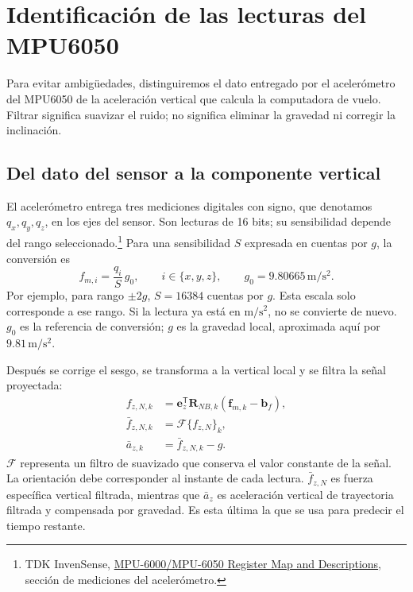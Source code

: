 \documentclass[11pt,a4paper]{article}
\begin{document}
\newpage
\section{Identificación de las lecturas del MPU6050}
Para evitar ambigüedades, distinguiremos el dato entregado por el acelerómetro del MPU6050 de la aceleración vertical que calcula la computadora de vuelo. Filtrar significa suavizar el ruido; no significa eliminar la gravedad ni corregir la inclinación.

\subsection{Del dato del sensor a la componente vertical}
El acelerómetro entrega tres mediciones digitales con signo, que denotamos $q_x,q_y,q_z$, en los ejes del sensor. Son lecturas de 16 bits; su sensibilidad depende del rango seleccionado.\footnote{TDK InvenSense, \href{https://invensense.tdk.com/wp-content/uploads/2015/02/MPU-6000-Register-Map1.pdf}{MPU-6000/MPU-6050 Register Map and Descriptions}, sección de mediciones del acelerómetro.}
Para una sensibilidad $S$ expresada en cuentas por $g$, la conversión es
\begin{equation}
 f_{m,i}=\frac{q_i}{S}\,g_0,\qquad i\in\{x,y,z\},
 \qquad g_0=9.80665\,\mathrm{m/s^2}.
\end{equation}
Por ejemplo, para rango $\pm2g$, $S=16384$ cuentas por $g$. Esta escala solo corresponde a ese rango. Si la lectura ya está en $\mathrm{m/s^2}$, no se convierte de nuevo. $g_0$ es la referencia de conversión; $g$ es la gravedad local, aproximada aquí por $9.81\,\mathrm{m/s^2}$.

Después se corrige el sesgo, se transforma a la vertical local y se filtra la señal proyectada:
\begin{align}
 f_{z,N,k}&=\mathbf e_z^{\mathsf T}\mathbf R_{NB,k}
 (\mathbf f_{m,k}-\mathbf b_f),\\
 \bar f_{z,N,k}&=\mathcal F\{f_{z,N}\}_k,\\
 \boxed{\bar a_{z,k}}&=\boxed{\bar f_{z,N,k}-g}.
\end{align}
$\mathcal F$ representa un filtro de suavizado que conserva el valor constante de la señal. La orientación debe corresponder al instante de cada lectura. $\bar f_{z,N}$ es fuerza específica vertical filtrada, mientras que $\bar a_z$ es aceleración vertical de trayectoria filtrada y compensada por gravedad. Es esta última la que se usa para predecir el tiempo restante.
\end{document}
